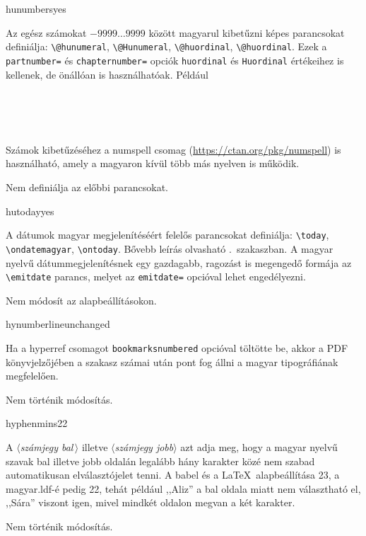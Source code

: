 \documentclass[12pt]{article}
\newcommand\param[1]{{\normalfont\slshape$\langle$#1$\rangle$}}
\begin{document}
\begin{description}
\begin{hunopt}{hunumbers}{yes}
\item[yes]
Az egész számokat $-9999\dots9999$ között magyarul kibetűzni képes parancsokat definiálja: \verb|\@hunumeral|, \verb|\@Hunumeral|, \verb|\@huordinal|, \verb|\@huordinal|.
Ezek a \texttt{partnumber=} és \texttt{chapternumber=} opciók \texttt{huordinal} és \texttt{Huordinal} értékeihez is kellenek, de önállóan is használhatóak.
Például
\begin{latexexample}
\makeatletter
{}\\
\\
\\
\makeatother
\end{latexexample}
Számok kibetűzéséhez a \textsf{numspell} csomag (\url{https://ctan.org/pkg/numspell}) is használható, amely a magyaron kívül több más nyelven is működik.
\item[no]
Nem definiálja az előbbi parancsokat.
\end{hunopt}

\begin{hunopt}{hutoday}{yes}
\item[yes]
A dátumok magyar megjelenítéséért felelős parancsokat definiálja: \verb|\today|, \verb|\ondatemagyar|, \verb|\ontoday|.
Bővebb leírás olvasható .~szakaszban.
A magyar nyelvű dátummegjelenítésnek egy gazdagabb, ragozást is megengedő formája az \verb|\emitdate| parancs, melyet az \texttt{emitdate=} opcióval lehet engedélyezni.
\item[no]
Nem módosít az alapbeállításokon.
\end{hunopt}

\begin{hunopt}{hynumberline}{unchanged}
\item[hu]
Ha a \textsf{hyperref} csomagot \texttt{bookmarksnumbered} opcióval töltötte be, akkor a PDF könyvjelzőjében a szakasz számai után pont fog állni a magyar tipográfiának megfelelően.
\item[unchanged]
Nem történik módosítás.
\end{hunopt}

\begin{hunopt}{hyphenmins}{22}
\item[\param{számjegy bal\,}\param{számjegy jobb}]
A \param{számjegy bal\,} illetve \param{számjegy jobb} azt adja meg, hogy a magyar nyelvű szavak bal illetve jobb oldalán legalább hány karakter közé nem szabad automatikusan elválasztójelet tenni.
A \textsf{babel} és a \LaTeX\ alapbeállítása 23, a \textsf{magyar.ldf}-é pedig 22, tehát például ,,Aliz'' a bal oldala miatt nem választható el, ,,Sára'' viszont igen, mivel mindkét oldalon megvan a két karakter.
\item[unchanged]
Nem történik módosítás.
\end{hunopt}


\end{description}
\end{document}
